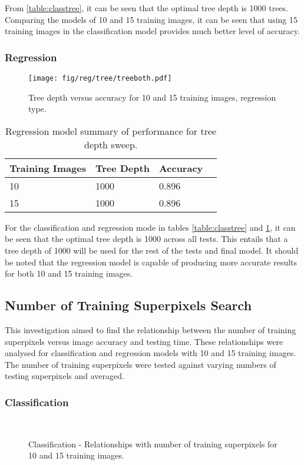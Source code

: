 From \ref{table:classtree}, it can be seen that the optimal tree depth is 1000 trees. Comparing the models of 10 and 15 training images, it can be seen that using 15 training images in the classification model provides much better level of accuracy.

\subsubsection{Regression}

\begin{figure}[H]
\centering
\texttt{[image: fig/reg/tree/treeboth.pdf]}
\caption{Tree depth versus accuracy for 10 and 15 training images, regression type.}
\label{reg:tree}
\end{figure}

\begin{table}[H]
\centering
\caption{Regression model summary of performance for tree depth sweep.}

\begin{tabular}{|l|l|l|l|}
\hline
 \textbf{Training Images} &	\textbf{Tree Depth} & \textbf{Accuracy}\\
\hline
10 & 1000 & 0.896\\
\hline				    	 			
15 & 1000 & 0.896 \\	
\hline		    	 
\end{tabular}
\label{table:regtree}
\end{table}

For the classification and regression mode in tables \ref{table:classtree} and \ref{table:regtree}, it can be seen that the optimal tree depth is 1000 across all tests. This entails that a tree depth of 1000 will be used for the rest of the tests and final model. It should be noted that the regression model is capable of producing more accurate results for both 10 and 15 training images. 

\subsection{Number of Training Superpixels Search}
\label{res:trainpix}
This investigation aimed to find the relationship between the number of training superpixels versus image accuracy and testing time. These relationships were analysed for classification and regression models with 10 and 15 training images. The number of training superpixels were tested against varying numbers of testing superpixels and averaged. 

\subsubsection{Classification}
\begin{figure}[H]
    \centering
    \\
    \caption{Classification - Relationships with number of training superpixels for 10 and 15 training images.}%
    \label{class:trainpix}
\end{figure}

